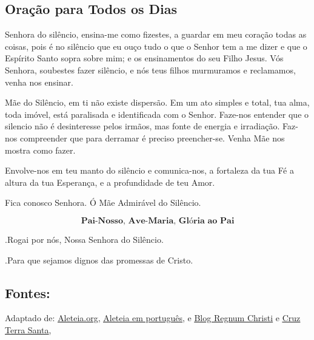 \documentclass[a4paper,14pt]{extarticle} \usepackage[utf8]{inputenc}
\makeatletter
\newcommand{\vers@resp@sym}{%
  \raisebox{0.2ex}{\rotatebox[origin=c]{-20}{$\m@th\rceil$}}%
}
\newcommand{\vers@resp}[2]{%
  {\ooalign{%
     \hidewidth\kern#1\vers@resp@sym\hidewidth\cr
     #2\cr
  }}%
}
\DeclareRobustCommand{\versicle}{\vers@resp{-0.1em}{V}}
\DeclareRobustCommand{\response}{\vers@resp{0pt}{R}}
\makeatother
\begin{document}
\subsection*{Oração para Todos os Dias}

Senhora do silêncio, ensina-me como fizestes, a guardar em meu coração todas as coisas, pois é no silêncio que eu ouço tudo o que o Senhor tem a me dizer e que o Espírito Santo sopra sobre mim; e os ensinamentos do seu Filho Jesus. Vós Senhora, soubestes fazer silêncio, e nós teus filhos murmuramos e reclamamos, venha nos ensinar.

Mãe do Silêncio, em ti não existe dispersão. Em um ato simples e total, tua alma, toda imóvel, está paralisada e identificada com o Senhor. Faze-nos entender que o silencio não é desinteresse pelos irmãos, mas fonte de energia e irradiação. Faz-nos compreender que para derramar é preciso preencher-se. Venha Mãe nos mostra como fazer.

Envolve-nos em teu manto do silêncio e comunica-nos, a fortaleza da tua Fé a altura da tua Esperança, e a profundidade de teu Amor.

Fica conosco Senhora. Ó Mãe Admirável do Silêncio.


\[
  \textbf{Pai-Nosso, Ave-Maria, Glória ao Pai}
\]

\response.\quad Rogai por nós, Nossa Senhora do Silêncio.

\versicle.\quad Para que sejamos dignos das promessas de Cristo.


\vfill

\begin{center}
\subsection*{Fontes:}
Adaptado de: \underline{\href{https://aleteia.org/2019/04/16/consecrate-yourself-to-our-lady-of-silence-with-this-prayer/}{Aleteia.org}}, \underline{\href{https://pt.aleteia.org/2017/11/28/por-que-o-papa-levou-nossa-senhora-do-silencio-para-o-vaticano/}{Aleteia em português}}, e  \underline{\href{https://www.regnumchristi.com/en/our-lady-of-silence/}{Blog Regnum Christi}} e \underline{\href{https://cruzterrasanta.com.br/historia-de-nossa-senhora-do-silencio/475/102/}{Cruz Terra Santa}},
\end{center}
\end{document}
